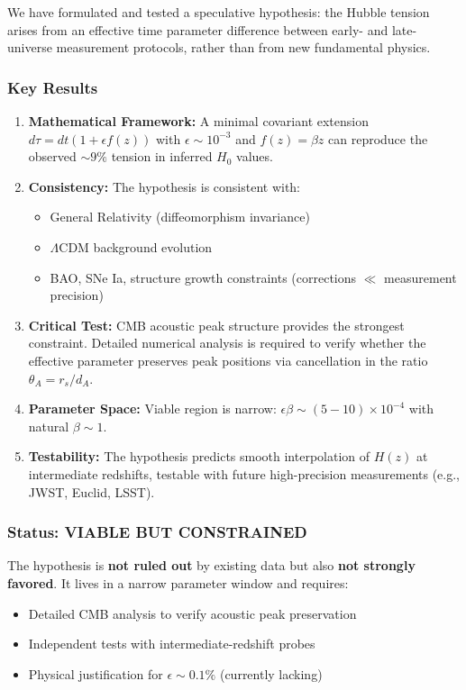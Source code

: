 We have formulated and tested a speculative hypothesis: the Hubble tension arises from an effective time parameter difference between early- and late-universe measurement protocols, rather than from new fundamental physics.

\subsubsection{Key Results}

\begin{enumerate}
    \item \textbf{Mathematical Framework:} A minimal covariant extension $d\tau = dt(1 + \epsilon f(z))$ with $\epsilon \sim 10^{-3}$ and $f(z) = \beta z$ can reproduce the observed $\sim 9\%$ tension in inferred $H_0$ values.
    
    \item \textbf{Consistency:} The hypothesis is consistent with:
    \begin{itemize}
        \item General Relativity (diffeomorphism invariance)
        \item $\Lambda$CDM background evolution
        \item BAO, SNe Ia, structure growth constraints (corrections $\ll$ measurement precision)
    \end{itemize}
    
    \item \textbf{Critical Test:} CMB acoustic peak structure provides the strongest constraint. Detailed numerical analysis is required to verify whether the effective parameter preserves peak positions via cancellation in the ratio $\theta_A = r_s/d_A$.
    
    \item \textbf{Parameter Space:} Viable region is narrow: $\epsilon \beta \sim (5-10) \times 10^{-4}$ with natural $\beta \sim 1$.
    
    \item \textbf{Testability:} The hypothesis predicts smooth interpolation of $H(z)$ at intermediate redshifts, testable with future high-precision measurements (e.g., JWST, Euclid, LSST).
\end{enumerate}

\subsubsection{Status: VIABLE BUT CONSTRAINED}

The hypothesis is \textbf{not ruled out} by existing data but also \textbf{not strongly favored}. It lives in a narrow parameter window and requires:
\begin{itemize}
    \item Detailed CMB analysis to verify acoustic peak preservation
    \item Independent tests with intermediate-redshift probes
    \item Physical justification for $\epsilon \sim 0.1\%$ (currently lacking)
\end{itemize}


